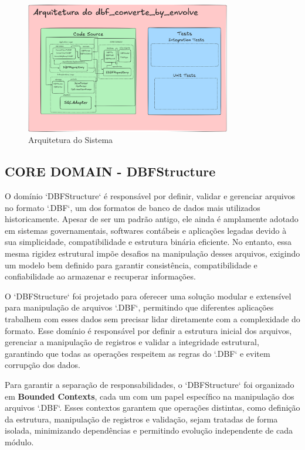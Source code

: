 \begin{titlepage}
    \begin{figure}[H]
        \centering
        \includegraphics[width=0.8\textwidth]{image/dbf_converter_arquitetura.png}
        \caption{Arquitetura do Sistema}
        \label{fig:minha_imagem}
    \end{figure}

    \subsection{CORE DOMAIN - DBFStructure}
    O domínio `DBFStructure` é responsável por definir, validar e gerenciar
    arquivos no formato `.DBF`, um dos formatos de banco de dados mais utilizados
    historicamente. Apesar de ser um padrão antigo, ele ainda é amplamente adotado
    em sistemas governamentais, softwares contábeis e aplicações legadas devido à
    sua simplicidade, compatibilidade e estrutura binária eficiente. No entanto,
    essa mesma rigidez estrutural impõe desafios na manipulação desses arquivos,
    exigindo um modelo bem definido para garantir consistência, compatibilidade e
    confiabilidade ao armazenar e recuperar informações.

    O `DBFStructure` foi projetado para oferecer uma solução modular e extensível
    para manipulação de arquivos `.DBF`, permitindo que diferentes aplicações
    trabalhem com esses dados sem precisar lidar diretamente com a complexidade do
    formato. Esse domínio é responsável por definir a estrutura inicial dos
    arquivos, gerenciar a manipulação de registros e validar a integridade
    estrutural, garantindo que todas as operações respeitem as regras do `.DBF` e
    evitem corrupção dos dados.

    Para garantir a separação de responsabilidades, o `DBFStructure` foi organizado
    em \textbf{Bounded Contexts}, cada um com um papel específico na manipulação dos
    arquivos `.DBF`. Esses contextos garantem que operações distintas, como
    definição da estrutura, manipulação de registros e validação, sejam tratadas de
    forma isolada, minimizando dependências e permitindo evolução independente de
    cada módulo.


\end{titlepage}
